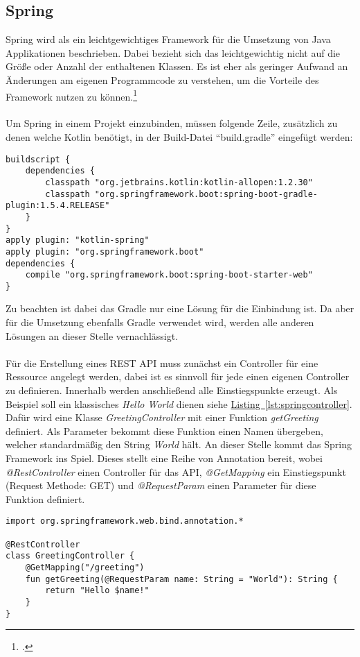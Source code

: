 \subsection{Spring}\label{sec:bibspring}
Spring wird als ein leichtgewichtiges Framework für die Umsetzung von Java Applikationen beschrieben. Dabei bezieht sich das leichtgewichtig nicht auf die Größe oder Anzahl der enthaltenen Klassen. Es ist eher als geringer Aufwand an Änderungen am eigenen Programmcode zu verstehen, um die Vorteile des Framework nutzen zu können.\footcite{proSpring5}\\
\\
Um Spring in einem Projekt einzubinden, müssen folgende Zeile, zusätzlich zu denen welche Kotlin benötigt, in der Build-Datei \enquote{build.gradle} eingefügt werden:
\begin{lstlisting}[caption={Einbindung des Spring Framework mithilfe von Gradle}]
buildscript {
	dependencies {
		classpath "org.jetbrains.kotlin:kotlin-allopen:1.2.30"
		classpath "org.springframework.boot:spring-boot-gradle-plugin:1.5.4.RELEASE"
	}
}
apply plugin: "kotlin-spring"
apply plugin: "org.springframework.boot"
dependencies {
	compile "org.springframework.boot:spring-boot-starter-web"
}
\end{lstlisting}
Zu beachten ist dabei das Gradle nur eine Lösung für die Einbindung ist. Da aber für die Umsetzung ebenfalls Gradle verwendet wird, werden alle anderen Lösungen an dieser Stelle vernachlässigt.\\
\\ 
Für die Erstellung eines \gls{REST} \gls{API} muss zunächst ein Controller für eine Ressource angelegt werden, dabei ist es sinnvoll für jede einen eigenen Controller zu definieren. Innerhalb werden anschließend alle Einstiegspunkte erzeugt. Als Beispiel soll ein klassisches \textit{Hello World} dienen siehe \hyperref[lst:springcontroller]{Listing~\ref{lst:springcontroller}}. Dafür wird eine Klasse \textit{GreetingController} mit einer Funktion \textit{getGreeting} definiert. Als Parameter bekommt diese Funktion einen Namen übergeben, welcher standardmäßig den String \textit{World} hält. An dieser Stelle kommt das Spring Framework ins Spiel. Dieses stellt eine Reihe von Annotation bereit, wobei \textit{@RestController} einen Controller für das \gls{API}, \textit{@GetMapping} ein Einstiegspunkt (Request Methode: GET) und \textit{@RequestParam} einen Parameter für diese Funktion definiert. 
\begin{lstlisting}[caption={Beispiel: Spring Controller}]
import org.springframework.web.bind.annotation.*

@RestController
class GreetingController {
	@GetMapping("/greeting")
	fun getGreeting(@RequestParam name: String = "World"): String {
		return "Hello $name!"
	}
}
\end{lstlisting}\label{lst:springcontroller}
